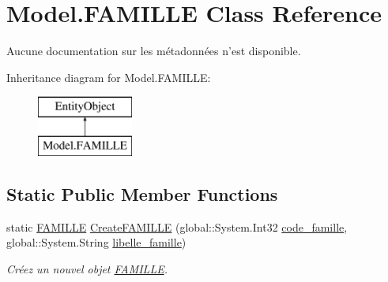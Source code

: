\hypertarget{class_model_1_1_f_a_m_i_l_l_e}{\section{Model.\-F\-A\-M\-I\-L\-L\-E Class Reference}
\label{class_model_1_1_f_a_m_i_l_l_e}
}


Aucune documentation sur les métadonnées n'est disponible.  


Inheritance diagram for Model.\-F\-A\-M\-I\-L\-L\-E\-:\begin{figure}[H]
\begin{center}
\leavevmode
\includegraphics[height=2.000000cm]{class_model_1_1_f_a_m_i_l_l_e}
\end{center}
\end{figure}
\subsection*{Static Public Member Functions}
\begin{DoxyCompactItemize}
\item 
static \hyperlink{class_model_1_1_f_a_m_i_l_l_e}{F\-A\-M\-I\-L\-L\-E} \hyperlink{class_model_1_1_f_a_m_i_l_l_e_abb575c2d885e4230a87d31b57908381a}{Create\-F\-A\-M\-I\-L\-L\-E} (global\-::\-System.\-Int32 \hyperlink{class_model_1_1_f_a_m_i_l_l_e_abc071e19c0a17263b4832abe947dbe63}{code\-\_\-famille}, global\-::\-System.\-String \hyperlink{class_model_1_1_f_a_m_i_l_l_e_a6ad0fa990e4747965f85c31ff3a67670}{libelle\-\_\-famille})
\begin{DoxyCompactList}\small\item\em Créez un nouvel objet \hyperlink{class_model_1_1_f_a_m_i_l_l_e}{F\-A\-M\-I\-L\-L\-E}. \end{DoxyCompactList}\end{DoxyCompactItemize}
